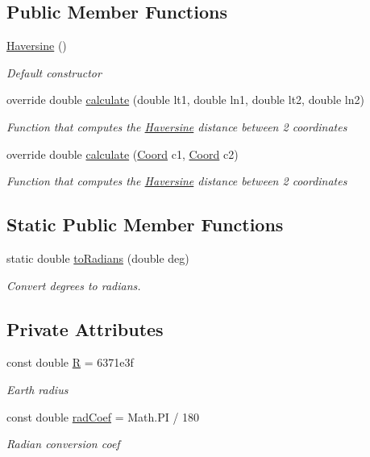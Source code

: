 \subsection*{Public Member Functions}
\begin{DoxyCompactItemize}
\item 
\hyperlink{classHaversine_af81a4fdf44f4e11a353a30efe42fcb5e}{Haversine} ()
\begin{DoxyCompactList}\small\item\em Default constructor \end{DoxyCompactList}\item 
override double \hyperlink{classHaversine_a63973b82d76e151b9f55b0dbdb005e47}{calculate} (double lt1, double ln1, double lt2, double ln2)
\begin{DoxyCompactList}\small\item\em Function that computes the \hyperlink{classHaversine}{Haversine} distance between 2 coordinates \end{DoxyCompactList}\item 
override double \hyperlink{classHaversine_a8a29bca501391b8877510d832a90d384}{calculate} (\hyperlink{structCoord}{Coord} c1, \hyperlink{structCoord}{Coord} c2)
\begin{DoxyCompactList}\small\item\em Function that computes the \hyperlink{classHaversine}{Haversine} distance between 2 coordinates \end{DoxyCompactList}\end{DoxyCompactItemize}
\subsection*{Static Public Member Functions}
\begin{DoxyCompactItemize}
\item 
static double \hyperlink{classHaversine_a0ed23bed06e7e27cc8e8ad43cc7c5bb1}{to\+Radians} (double deg)
\begin{DoxyCompactList}\small\item\em Convert degrees to radians. \end{DoxyCompactList}\end{DoxyCompactItemize}
\subsection*{Private Attributes}
\begin{DoxyCompactItemize}
\item 
const double \hyperlink{classHaversine_a9f083aeda060fe62bb7aec4fb1ab59df}{R} = 6371e3f
\begin{DoxyCompactList}\small\item\em Earth radius\end{DoxyCompactList}\item 
const double \hyperlink{classHaversine_a841876caac549e822374daec9a9b95ab}{rad\+Coef} = Math.\+PI / 180
\begin{DoxyCompactList}\small\item\em Radian conversion coef\end{DoxyCompactList}\end{DoxyCompactItemize}


